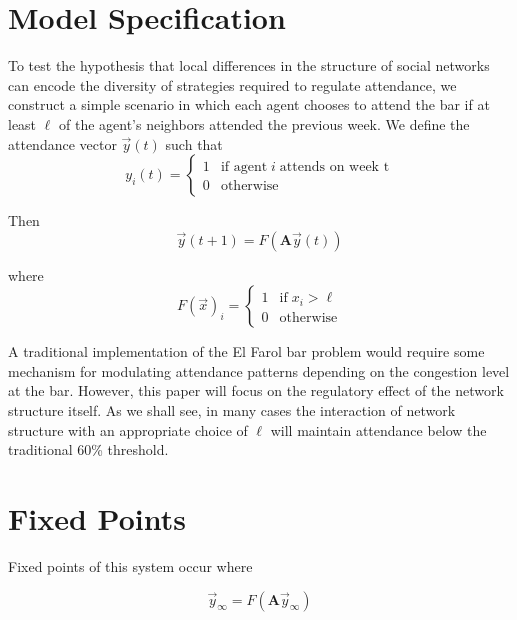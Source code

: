 \documentclass[12pt]{article}
\begin{document}
\section{Model Specification}
To test the hypothesis that local differences in the structure of social networks can encode the diversity of strategies required to regulate attendance, we construct a simple scenario in which each agent chooses to attend the bar if at least $\ell$ of the agent's neighbors attended the previous week.  We define the attendance vector $\vec{y}(t)$ such that
\begin{equation}
  y_i(t) = \begin{cases}
    1 &\text{if agent}\; i \; \text{attends on week t} \\
    0 &\text{otherwise}
  \end{cases}
\end{equation}

Then 
\begin{equation}
  \vec{y}(t + 1) = F(\mathbf{A}\vec{y}(t))
\end{equation}

where
\begin{equation}
  F(\vec{x})_i = \begin{cases}
    1 &\text{if} \; x_i > \ell \\
    0 &\text{otherwise}
  \end{cases}
\end{equation}

A traditional implementation of the El Farol bar problem would require some mechanism for modulating attendance patterns depending on the congestion level at the bar.  However, this paper will focus on the regulatory effect of the network structure itself.  As we shall see, in many cases the interaction of network structure with an appropriate choice of $\ell$ will maintain attendance below the traditional 60\% threshold. 

\section{Fixed Points}

Fixed points of this system occur where

\begin{equation}
  \vec{y}_{\infty} = F(\mathbf{A}\vec{y}_{\infty})
\end{equation}
\end{document}

